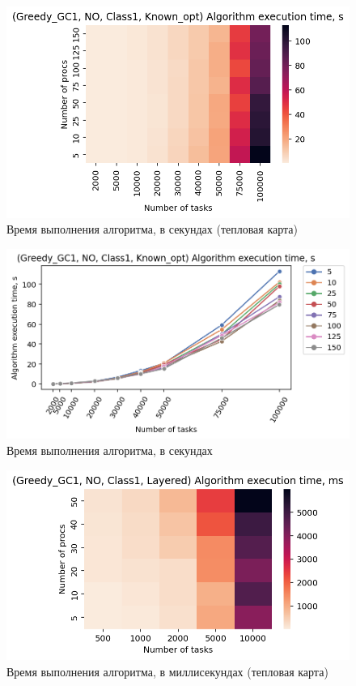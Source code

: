 \begin{figure}[!htbp]
    \centering
    \includegraphics[width=\textwidth]{imgs/ideal_1/NO/et_heatmap.png}
    \caption{Время выполнения алгоритма, в секундах (тепловая карта)}
    \label{fig:NO-exec-time-heatmap}
\end{figure}

\begin{figure}[!htbp]
    \centering
    \includegraphics[width=\textwidth]{imgs/ideal_1/NO/tr_graph.png}
    \caption{Время выполнения алгоритма, в секундах}
    \label{fig:NO-exec-time-compiled}
\end{figure}

\begin{figure}[!htbp]
    \centering
    \includegraphics[width=\textwidth]{imgs/layered_class_1/NO/et_heatmap.png}
    \caption{Время выполнения алгоритма, в миллисекундах (тепловая карта)}
    \label{fig:NO-layered-exec-time-heatmap}
\end{figure}

